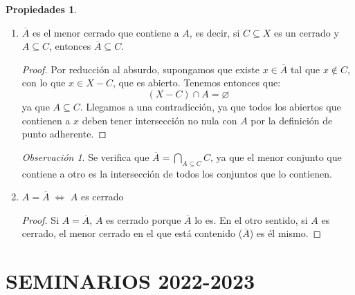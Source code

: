 \documentclass[12pt,twoside]{report}
\theoremstyle{azul}
\theoremstyle{azul2}
\theoremstyle{plain}
\theoremstyle{definition}
\newtheorem*{propi}{Propiedades}
\theoremstyle{remark}
\newtheorem*{obs}{Observación}
\begin{document}
\begin{propi}
\begin{enumerate}
    \item $\overline{A}$ es el menor cerrado que contiene a $A$, es decir, si $C \subseteq X$ es un cerrado y $A \subseteq C$, entonces $\overline{A} \subseteq C$.
    \begin{proof}
    Por reducción al absurdo, supongamos que existe $x \in \overline{A}$ tal que $x\not\in C$, con lo que $x\in X-C$, que es abierto. Tenemos entonces que:
    $$(X-C) \cap A = \varnothing$$
    ya que $A\subseteq C$. Llegamos a una contradicción, ya que todos los abiertos que contienen a $x$ deben tener intersección no nula con $A$ por la definición de punto adherente.
    \end{proof}
    \begin{obs}
    Se verifica que $\overline{A} = \underset{A \subseteq C}{\bigcap} C$, ya que el menor conjunto que contiene a otro es la intersección de todos los conjuntos que lo contienen.
    \end{obs}
    
    \item $A = \overline{A} \; \Leftrightarrow$ $A$ es cerrado
    \begin{proof}
    Si $A = \overline{A}$, $A$ es cerrado porque $\overline{A}$ lo es. En el otro sentido, si $A$ es cerrado, el menor cerrado en el que está contenido ($\overline{A}$) es él mismo.
    \end{proof}
    \end{enumerate}
\end{propi}



\chapter{SEMINARIOS 2022-2023} \label{S2}
\end{document}
